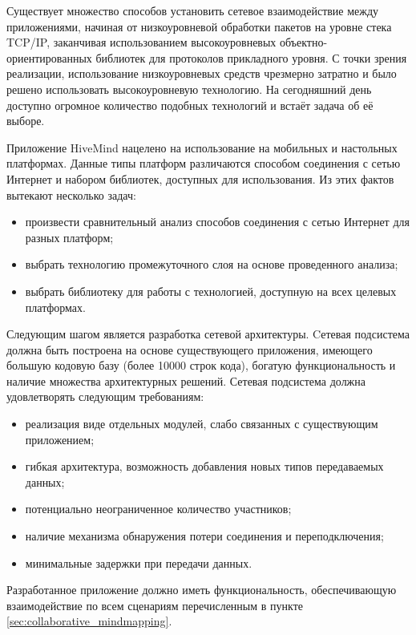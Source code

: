 Существует множество способов установить сетевое взаимодействие между
приложениями, начиная от низкоуровневой обработки пакетов на уровне стека
TCP/IP, заканчивая использованием высокоуровневых объектно-ориентированных
библиотек для протоколов прикладного уровня. С точки зрения реализации,
использование низкоуровневых средств чрезмерно затратно и было решено
использовать высокоуровневую технологию. На сегодняшний день доступно огромное
количество подобных технологий и встаёт задача об её выборе.

Приложение HiveMind нацелено на использование на мобильных и
настольных платформах. Данные типы платформ различаются способом соединения с
сетью Интернет и набором библиотек, доступных для использования. Из этих фактов
вытекают несколько задач:
\begin{itemize}
\item произвести сравнительный анализ способов соединения с сетью Интернет для
разных платформ;
\item выбрать технологию промежуточного слоя на основе проведенного анализа;
\item выбрать библиотеку для работы с технологией, доступную на всех целевых
платформах.
\end{itemize}

Следующим шагом является разработка сетевой архитектуры. Cетевая подсистема
должна быть построена на основе существующего приложения, имеющего большую
кодовую базу (более 10000 строк кода), богатую функциональность и наличие
множества архитектурных решений. Сетевая подсистема должна удовлетворять
следующим требованиям:
\begin{itemize}
\item реализация виде отдельных модулей, слабо связанных с существующим
приложением;
\item гибкая архитектура, возможность добавления новых типов передаваемых
данных;
\item потенциально неограниченное количество участников;
\item наличие механизма обнаружения потери соединения и переподключения;
\item минимальные задержки при передачи данных.
\end{itemize}
Разработанное приложение должно иметь функциональность, обеспечивающую
взаимодействие по всем сценариям перечисленным в пункте
\ref{sec:collaborative_mindmapping}.


